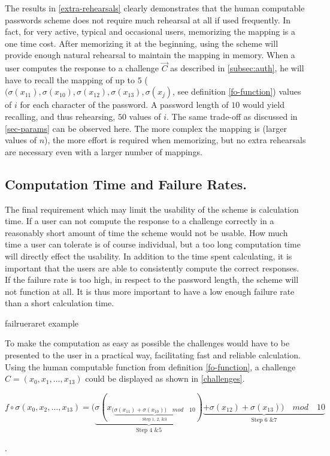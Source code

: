 \par The results in \autoref{extra-rehearsals} clearly demonstrates that the human computable passwords scheme does not require much rehearsal at all if used frequently. In fact, for very active, typical and occasional users, memorizing the mapping is a one time cost. After memorizing it at the beginning, using the scheme will provide enough natural rehearsal to maintain the mapping in memory. 
When a user computes the response to a challenge $\vec C$ as described in \autoref{subsec:auth}, he will have to recall the mapping of up to $5$ ($(\sigma(x_{11}), \sigma(x_{10}), \sigma(x_{12}), \sigma(x_{13}),\sigma(x_j)$, see definition \ref{fo-function}) values of $i$ for each character of the password. A password length of $10$ would yield recalling, and thus rehearsing, $50$ values of $i$. The same trade-off as discussed in \autoref{sec-params} can be observed here. The more complex the mapping is (larger values of $n$), the more effort is required when memorizing, but no extra rehearsals are necessary even with a larger number of mappings.

    \subsection{Computation Time and Failure Rates.}\label{computation-time}
The final requirement which may limit the usability of the scheme is calculation time. If a user can not compute the response to a challenge correctly in a reasonably short amount of time the scheme would not be usable. How much time a user can tolerate is of course individual, but a too long computation time will directly effect the usability. In addition to the time spent calculating, it is important that the users are able to consistently compute the correct responses. If the failure rate is too high, in respect to the password length, the scheme will not function at all. It is thus more important to have a low enough failure rate than a short calculation time.
\begin{example}
    failrueraret example
\end{example}
\par To make the computation as easy as possible the challenges would have to be presented to the user in a practical way, facilitating fast and reliable calculation. Using the human computable function from definition \ref{fo-function}, a challenge $C = (x_0, x_1,\dots, x_{13})$ could be displayed as shown in \autoref{challenges}. \\ 
\centerline{ $f\circ \sigma(x_0,x_2,\dots,x_{13}) = \big(\underbrace{\sigma ( x_{ (\underbrace{\sigma(x_{11}) + \sigma(x_{10}) )\quad mod \quad 10}_\text{Step 1, 2, \& 3}} )}_\text{Step 4 \& 5} \underbrace{ +\sigma ( x_{12} ) + \sigma( x_{13} )\big)\quad mod \quad 10 }_\text{Step 6 \& 7}$ }. 

